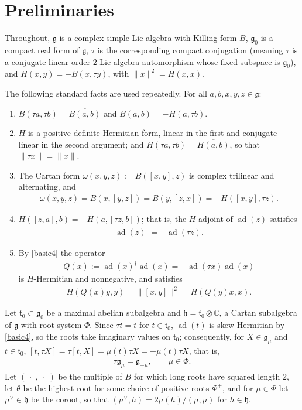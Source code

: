 \documentclass[leqno,10pt]{amsart}
\theoremstyle{definition}
\numberwithin{equation}{section}
\newcommand{\h}{\mathfrak{h}}
\newcommand{\om}{\omega}
\newcommand{\dum}{\,\cdot\,\,}
\newcommand{\g}{\mathfrak{g}}
\newcommand{\ad}{\operatorname{ad}}
\newcommand{\com}{\mathbb C}
\newcommand{\gz}{\g_{0}}
\newcommand{\norm}[1]{\lVert #1\rVert}
\newcommand{\qad}{Q}
\begin{document}
\section{Preliminaries}\label{sec:prelim}
Throughout, $\g$ is a complex simple Lie algebra with Killing form $B$, $\gz$ is a compact real form of $\g$, $\tau$ is the corresponding compact conjugation (meaning $\tau$ is a conjugate-linear order $2$ Lie algebra automorphism whose fixed subspace is $\gz$), and $H(x, y) = -B(x, \tau y)$, with $\norm{x}^{2} = H(x, x)$.

The following standard facts are used repeatedly. For all $a, b, x, y, z \in \g$:
\begin{enumerate}
\item $B(\tau a, \tau b) = \overline{B(a, b)}$ and $B(a, b) = -H(a, \tau b)$.
\item $H$ is a positive definite Hermitian form, linear in the first and conjugate-linear in the second argument; and $H(\tau a, \tau b) = \overline{H(a, b)}$, so that $\norm{\tau x} = \norm{x}$.
\item The Cartan form $\om(x, y, z) := B([x, y], z)$ is complex trilinear and alternating, and
\begin{align}\label{eq:omegaformulas}
\om(x, y, z) = B(x, [y, z]) = B(y, [z, x]) = -H([x, y], \tau z).
\end{align}
\item $H([z, a], b) = -H(a, [\tau z, b])$; that is, the $H$-adjoint of $\ad(z)$ satisfies
\begin{align}\label{basic4}
\ad(z)^{\dagger} = -\ad(\tau z).
\end{align}

\item By \eqref{basic4} the operator
\begin{align}\label{eq:qaddefined}
\qad(x):=\ad(x)^\dagger\ad(x) = -\ad(\tau x)\ad(x)
\end{align}
is $H$-Hermitian and nonnegative, and satisfies
\begin{align}\label{basic5}
H(\qad(x)y, y) = \norm{[x, y]}^{2} = H(\qad(y)x, x).
\end{align}
\end{enumerate}

Let $\mathfrak{t}_{0} \subset \gz$ be a maximal abelian subalgebra and $\h = \mathfrak{t}_{0} \otimes \com$, a Cartan subalgebra of $\g$ with root system $\Phi$. Since $\tau t = t$ for $t \in \mathfrak{t}_{0}$, $\ad(t)$ is skew-Hermitian by \eqref{basic4}, so the roots take imaginary values on $\mathfrak{t}_{0}$; consequently, for $X \in \g_{\mu}$ and $t \in \mathfrak{t}_{0}$, $[t, \tau X] = \tau[t, X] = \overline{\mu(t)}\tau X = -\mu(t)\tau X$, that is,
\begin{align}\label{eq:tauroot}
\tau\g_{\mu} = \g_{-\mu}, \qquad \mu \in \Phi.
\end{align}
Let $(\dum, \dum)$ be the multiple of $B$ for which long roots have squared length $2$, let $\theta$ be the highest root for some choice of positive roots $\Phi^{+}$, and for $\mu \in \Phi$ let $\mu^{\vee} \in \h$ be the coroot, so that $(\mu^{\vee}, h) = 2\mu(h)/(\mu, \mu)$ for $h \in \h$. 
\end{document}
